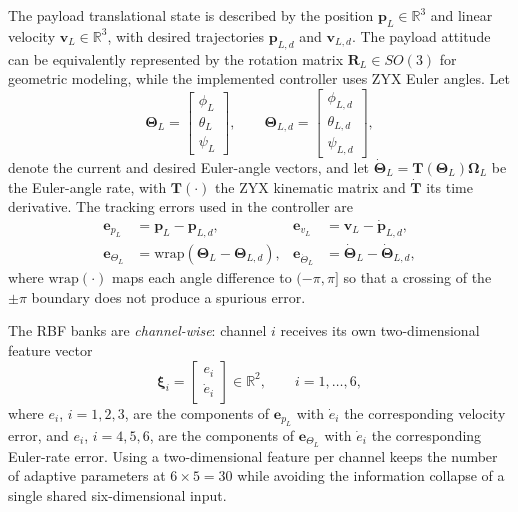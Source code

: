 \documentclass[Review,sageh,times]{sagej}
\begin{document}
The payload translational state is described by the position $\mathbf{p}_L\in\mathbb{R}^3$ and
linear velocity $\mathbf{v}_L\in\mathbb{R}^3$, with desired trajectories $\mathbf{p}_{L,d}$ and $\mathbf{v}_{L,d}$. The
payload attitude can be equivalently represented by the rotation matrix
$\mathbf{R}_L\in SO(3)$ for geometric modeling, while the implemented
controller uses ZYX Euler angles. Let
\begin{equation}
\boldsymbol{\Theta}_L =
\begin{bmatrix}
\phi_L\\ \theta_L\\ \psi_L
\end{bmatrix},
\qquad
\boldsymbol{\Theta}_{L,d} =
\begin{bmatrix}
\phi_{L,d}\\ \theta_{L,d}\\ \psi_{L,d}
\end{bmatrix},
\label{eq:eulerdef}
\end{equation}
denote the current and desired Euler-angle vectors, and let
$\dot{\boldsymbol{\Theta}}_L=\mathbf{T}(\boldsymbol{\Theta}_L)\boldsymbol{\Omega}_L$
be the Euler-angle rate, with $\mathbf{T}(\cdot)$ the ZYX kinematic matrix and
$\dot{\mathbf{T}}$ its time derivative. The tracking errors used in the controller are
\begin{equation}
\begin{aligned}
\mathbf{e}_{p_L} &= \mathbf{p}_L - \mathbf{p}_{L,d},
& \mathbf{e}_{v_L} &= \mathbf{v}_L - \dot{\mathbf{p}}_{L,d},\\
\mathbf{e}_{\Theta_L} &= \mathrm{wrap}(\boldsymbol{\Theta}_L - \boldsymbol{\Theta}_{L,d}),
& \mathbf{e}_{\dot\Theta_L} &= \dot{\boldsymbol{\Theta}}_L - \dot{\boldsymbol{\Theta}}_{L,d},
\end{aligned}
\label{eq:errors}
\end{equation}
where $\mathrm{wrap}(\cdot)$ maps each angle difference to $(-\pi,\pi]$ so that a
crossing of the $\pm\pi$ boundary does not produce a spurious error.

The RBF banks are \emph{channel-wise}: channel $i$ receives its own
two-dimensional feature vector
\begin{equation}
\boldsymbol{\xi}_i =
\begin{bmatrix}
e_i\\ \dot{e}_i
\end{bmatrix}
\in\mathbb{R}^2,
\qquad i=1,\ldots,6,
\label{eq:rbfinput}
\end{equation}
where $e_i$, $i=1,2,3$, are the components of $\mathbf{e}_{p_L}$ with
$\dot e_i$ the corresponding velocity error, and $e_i$, $i=4,5,6$, are the
components of $\mathbf{e}_{\Theta_L}$ with $\dot e_i$ the corresponding Euler-rate
error. Using a two-dimensional feature per channel keeps the number of
adaptive parameters at $6\times5=30$ while avoiding the information
collapse of a single shared six-dimensional input.
\end{document}
